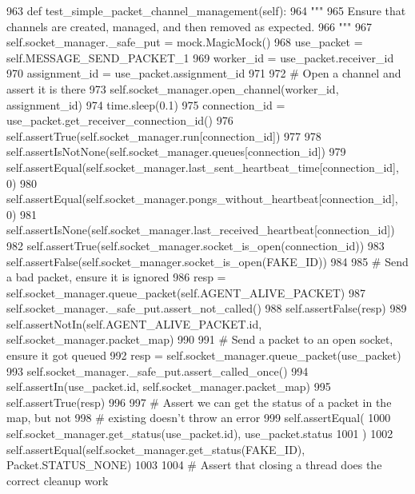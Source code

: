 \begin{DoxyCode}
963     \textcolor{keyword}{def }test\_simple\_packet\_channel\_management(self):
964         \textcolor{stringliteral}{"""}
965 \textcolor{stringliteral}{        Ensure that channels are created, managed, and then removed as expected.}
966 \textcolor{stringliteral}{        """}
967         self.socket\_manager.\_safe\_put = mock.MagicMock()
968         use\_packet = self.MESSAGE\_SEND\_PACKET\_1
969         worker\_id = use\_packet.receiver\_id
970         assignment\_id = use\_packet.assignment\_id
971 
972         \textcolor{comment}{# Open a channel and assert it is there}
973         self.socket\_manager.open\_channel(worker\_id, assignment\_id)
974         time.sleep(0.1)
975         connection\_id = use\_packet.get\_receiver\_connection\_id()
976         self.assertTrue(self.socket\_manager.run[connection\_id])
977 
978         self.assertIsNotNone(self.socket\_manager.queues[connection\_id])
979         self.assertEqual(self.socket\_manager.last\_sent\_heartbeat\_time[connection\_id], 0)
980         self.assertEqual(self.socket\_manager.pongs\_without\_heartbeat[connection\_id], 0)
981         self.assertIsNone(self.socket\_manager.last\_received\_heartbeat[connection\_id])
982         self.assertTrue(self.socket\_manager.socket\_is\_open(connection\_id))
983         self.assertFalse(self.socket\_manager.socket\_is\_open(FAKE\_ID))
984 
985         \textcolor{comment}{# Send a bad packet, ensure it is ignored}
986         resp = self.socket\_manager.queue\_packet(self.AGENT\_ALIVE\_PACKET)
987         self.socket\_manager.\_safe\_put.assert\_not\_called()
988         self.assertFalse(resp)
989         self.assertNotIn(self.AGENT\_ALIVE\_PACKET.id, self.socket\_manager.packet\_map)
990 
991         \textcolor{comment}{# Send a packet to an open socket, ensure it got queued}
992         resp = self.socket\_manager.queue\_packet(use\_packet)
993         self.socket\_manager.\_safe\_put.assert\_called\_once()
994         self.assertIn(use\_packet.id, self.socket\_manager.packet\_map)
995         self.assertTrue(resp)
996 
997         \textcolor{comment}{# Assert we can get the status of a packet in the map, but not}
998         \textcolor{comment}{# existing doesn't throw an error}
999         self.assertEqual(
1000             self.socket\_manager.get\_status(use\_packet.id), use\_packet.status
1001         )
1002         self.assertEqual(self.socket\_manager.get\_status(FAKE\_ID), Packet.STATUS\_NONE)
1003 
1004         \textcolor{comment}{# Assert that closing a thread does the correct cleanup work}

\end{DoxyCode}
